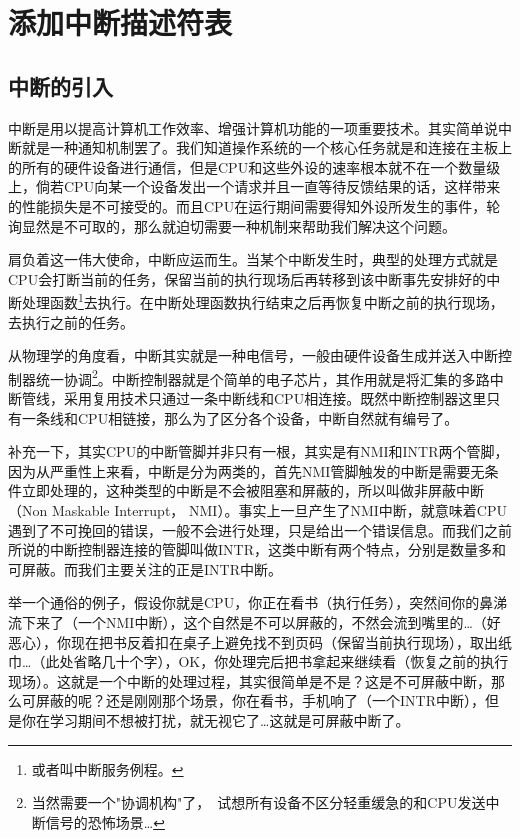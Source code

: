 
\section {添加中断描述符表}

\subsection{中断的引入}

\par 中断是用以提高计算机工作效率、增强计算机功能的一项重要技术。其实简单说中断就是一种通知机制罢了。我们知道操作系统的一个核心任务就是和连接在主板上的所有的硬件设备进行通信，但是CPU和这些外设的速率根本就不在一个数量级上，倘若CPU向某一个设备发出一个请求并且一直等待反馈结果的话，这样带来的性能损失是不可接受的。而且CPU在运行期间需要得知外设所发生的事件，轮询显然是不可取的，那么就迫切需要一种机制来帮助我们解决这个问题。

\par 肩负着这一伟大使命，中断应运而生。当某个中断发生时，典型的处理方式就是CPU会打断当前的任务，保留当前的执行现场后再转移到该中断事先安排好的中断处理函数\footnote{或者叫中断服务例程。}去执行。在中断处理函数执行结束之后再恢复中断之前的执行现场，去执行之前的任务。

\par 从物理学的角度看，中断其实就是一种电信号，一般由硬件设备生成并送入中断控制器统一协调\footnote{当然需要一个"协调机构"了，\allowbreak\
试想所有设备不区分轻重缓急的和CPU发送中断信号的恐怖场景…}。中断控制器就是个简单的电子芯片，其作用就是将汇集的多路中断管线，采用复用技术只通过一条中断线和CPU相连接。既然中断控制器这里只有一条线和CPU相链接，那么为了区分各个设备，中断自然就有编号了。

\par 补充一下，其实CPU的中断管脚并非只有一根，其实是有NMI和INTR两个管脚，因为从严重性上来看，中断是分为两类的，首先NMI管脚触发的中断是需要无条件立即处理的，这种类型的中断是不会被阻塞和屏蔽的，所以叫做非屏蔽中断（Non Maskable Interrupt， NMI）。事实上一旦产生了NMI中断，就意味着CPU遇到了不可挽回的错误，一般不会进行处理，只是给出一个错误信息。而我们之前所说的中断控制器连接的管脚叫做INTR，这类中断有两个特点，分别是数量多和可屏蔽。而我们主要关注的正是INTR中断。

\par 举一个通俗的例子，假设你就是CPU，你正在看书（执行任务），突然间你的鼻涕流下来了（一个NMI中断），这个自然是不可以屏蔽的，不然会流到嘴里的…（好恶心），你现在把书反着扣在桌子上避免找不到页码（保留当前执行现场），取出纸巾…（此处省略几十个字），OK，你处理完后把书拿起来继续看（恢复之前的执行现场）。这就是一个中断的处理过程，其实很简单是不是？这是不可屏蔽中断，那么可屏蔽的呢？还是刚刚那个场景，你在看书，手机响了（一个INTR中断），但是你在学习期间不想被打扰，就无视它了…这就是可屏蔽中断了。

